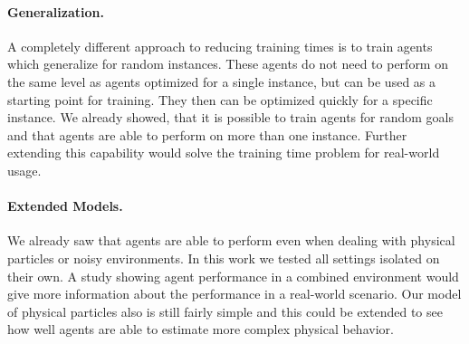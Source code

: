 \paragraph{Generalization.}
A completely different approach to reducing training times is to train agents which generalize for random instances. These agents do not need to perform on the same level as agents optimized for a single instance, but can be used as a starting point for training. They then can be optimized quickly for a specific instance. We already showed, that it is possible to train agents for random goals and that agents are able to perform on more than one instance. Further extending this capability would solve the training time problem for real-world usage.

\paragraph{Extended Models.}
We already saw that agents are able to perform even when dealing with physical particles or noisy environments. In this work we tested all settings isolated on their own. A study showing agent performance in a combined environment would give more information about the performance in a real-world scenario. Our model of physical particles also is still fairly simple and this could be extended to see how well agents are able to estimate more complex physical behavior.

